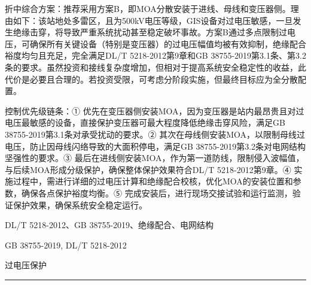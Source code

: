 \documentclass[12pt,a4paper]{ctexart}
\begin{document}
\begin{description}[leftmargin=1.5em,style=nextline,font=\normalfont]
折中综合方案：推荐采用方案B，即MOA分散安装于进线、母线和变压器侧。理由如下：该站地处多雷区，且为500kV电压等级，GIS设备对过电压敏感，一旦发生绝缘击穿，将导致严重系统扰动甚至稳定破坏事故。方案B通过多点限制过电压，可确保所有关键设备（特别是变压器）的过电压幅值均被有效抑制，绝缘配合裕度均匀且充足，完全满足DL/T 5218-2012第9章和GB 38755-2019第3.1条、第3.2条的要求。虽然投资和接线复杂度增加，但相对于提高系统安全稳定性的收益，此代价是必要且合理的。若投资受限，可考虑分阶段实施，但最终目标应为全分散配置。

控制优先级链条：① 优先在变压器侧安装MOA，因为变压器是站内最昂贵且对过电压最敏感的设备，直接保护变压器可最大程度降低绝缘击穿风险，满足GB 38755-2019第3.1条对承受扰动的要求。② 其次在母线侧安装MOA，以限制母线过电压，防止因母线闪络导致的大面积停电，满足GB 38755-2019第3.2条对电网结构坚强性的要求。③ 最后在进线侧安装MOA，作为第一道防线，限制侵入波幅值，与后续MOA形成分级保护，确保整体保护效果符合DL/T 5218-2012第9章。④ 实施过程中，需进行详细的过电压计算和绝缘配合校核，优化MOA的安装位置和参数，确保各点保护裕度均衡。⑤ 完成安装后，进行现场交接试验和运行监测，验证保护效果，确保系统安全稳定运行。
  \item[KW:] DL/T 5218-2012、GB 38755-2019、绝缘配合、电网结构
  \item[Std:] GB 38755-2019, DL/T 5218-2012
  \item[Topic:] 过电压保护
\end{description}
\vspace{4pt}
\hrule\vspace{6pt}
\end{document}
